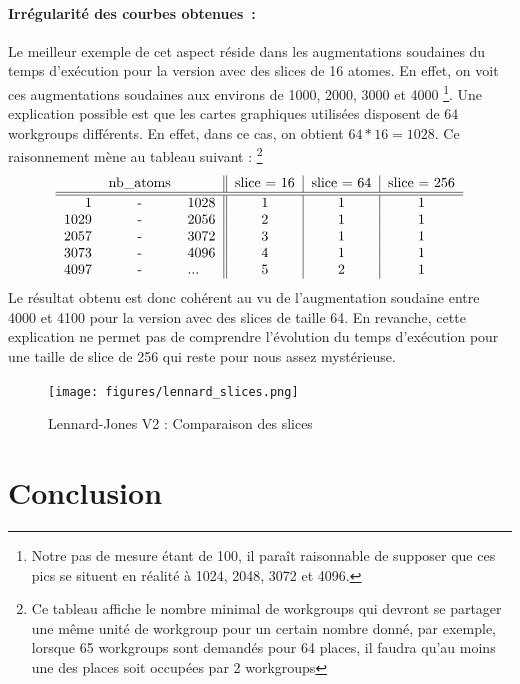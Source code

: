 \documentclass{article}
\begin{document}
\paragraph{Irrégularité des courbes obtenues~:}
Le meilleur exemple de cet aspect réside dans les augmentations soudaines du
temps d'exécution pour la version avec des slices de 16 atomes. En effet, on
voit ces augmentations soudaines aux environs de 1000, 2000, 3000 et 4000
\footnote{Notre pas de mesure étant de 100, il paraît raisonnable de supposer
que ces pics se situent en réalité à 1024, 2048, 3072 et 4096.}. Une explication
possible est que les cartes graphiques utilisées disposent de 64 workgroups
différents. En effet, dans ce cas, on obtient $64 * 16 = 1028$. Ce raisonnement
mène au tableau suivant :
\footnote{Ce tableau affiche le nombre minimal de workgroups qui devront se
partager une même unité de workgroup pour un certain nombre donné, par exemple,
lorsque 65 workgroups sont demandés pour 64 places, il faudra qu'au moins une
des places soit occupées par 2 workgroups}
$$
  \begin{tabular}{rcl||c|c|c}
    &nb\_atoms&& slice = 16 & slice = 64 & slice = 256\\
    \hline \hline
       1&-&1028  &      1     &      1     &       1  \\
    1029&-&2056  &      2     &      1     &       1  \\
    2057&-&3072  &      3     &      1     &       1  \\
    3073&-&4096  &      4     &      1     &       1  \\
    4097&-&...   &      5     &      2     &       1
  \end{tabular}
$$
Le résultat obtenu est donc cohérent au vu de l'augmentation soudaine entre
4000 et 4100 pour la version avec des slices de taille 64. En revanche, cette
explication ne permet pas de comprendre l'évolution du temps d'exécution pour
une taille de slice de 256 qui reste pour nous assez mystérieuse.

\begin{figure}[htb]
	\caption{Lennard-Jones V2 : Comparaison des slices}
	\label{lennard-slices}
	\texttt{[image: figures/lennard\_slices.png]}
\end{figure}
\section{Conclusion}
\end{document}
